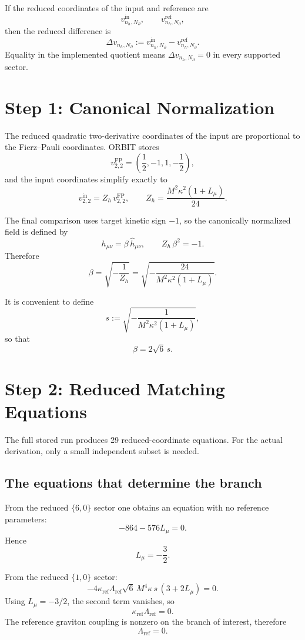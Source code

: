\documentclass[11pt]{article}
\newcommand{\Lmu}{L_\mu}
\begin{document}
If the reduced coordinates of the input and reference are
\[
v^{\mathrm{in}}_{n_h,N_\partial},
\qquad
v^{\mathrm{ref}}_{n_h,N_\partial},
\]
then the reduced difference is
\[
\Delta v_{n_h,N_\partial}
:=
v^{\mathrm{in}}_{n_h,N_\partial}
-v^{\mathrm{ref}}_{n_h,N_\partial}.
\]
Equality in the implemented quotient means $\Delta v_{n_h,N_\partial}=0$ in every supported sector.

\section{Step 1: Canonical Normalization}

The reduced quadratic two-derivative coordinates of the input are proportional to the Fierz--Pauli coordinates. ORBIT stores
\[
v^{\mathrm{FP}}_{2,2}
=
\left(\frac12,-1,1,-\frac12\right),
\]
and the input coordinates simplify exactly to
\[
v^{\mathrm{in}}_{2,2}
=
Z_h\,v^{\mathrm{FP}}_{2,2},
\qquad
Z_h=\frac{M^2\kappa^2(1+\Lmu)}{24}.
\]

The final comparison uses target kinetic sign $-1$, so the canonically normalized field is defined by
\[
h_{\mu\nu}=\beta\,\widehat h_{\mu\nu},
\qquad
Z_h\,\beta^2=-1.
\]
Therefore
\[
\beta
=
\sqrt{-\frac{1}{Z_h}}
=
\sqrt{-\frac{24}{M^2\kappa^2(1+\Lmu)}}.
\]

It is convenient to define
\[
s:=\sqrt{-\frac{1}{M^2\kappa^2(1+\Lmu)}},
\]
so that
\[
\beta=2\sqrt6\,s.
\]

\section{Step 2: Reduced Matching Equations}

The full stored run produces 29 reduced-coordinate equations. For the actual derivation, only a small independent subset is needed.

\subsection{The equations that determine the branch}

From the reduced $\{6,0\}$ sector one obtains an equation with no reference parameters:
\begin{equation}
-864-576\Lmu=0.
\end{equation}
Hence
\begin{equation}
\boxed{\Lmu=-\frac32.}
\end{equation}

From the reduced $\{1,0\}$ sector:
\begin{equation}
-4\kappa_{\mathrm{ref}}\Lambda_{\mathrm{ref}}
\sqrt6\,M^4\kappa\,s\,(3+2\Lmu)=0.
\end{equation}
Using $\Lmu=-3/2$, the second term vanishes, so
\begin{equation}
\kappa_{\mathrm{ref}}\Lambda_{\mathrm{ref}}=0.
\end{equation}
The reference graviton coupling is nonzero on the branch of interest, therefore
\begin{equation}
\boxed{\Lambda_{\mathrm{ref}}=0.}
\end{equation}
\end{document}
